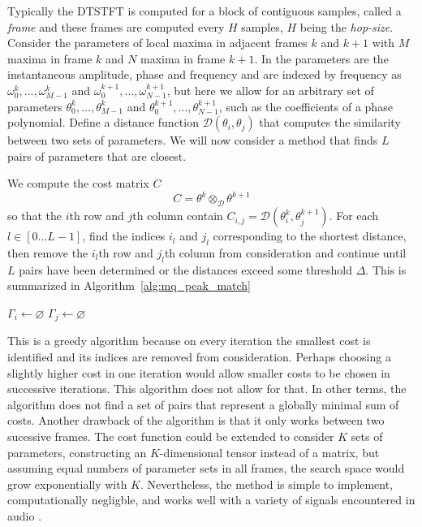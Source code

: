\documentclass[letterpaper,12pt]{report}
\DeclareMathOperator{\argmin}{argmin}
\begin{document}
Typically the DTSTFT is computed for a block of contiguous samples, called a
\textit{frame} and these frames are computed every $H$ samples, $H$ being the
\textit{hop-size}. Consider the parameters of local maxima in adjacent frames
$k$ and $k+1$ with $M$ maxima in frame $k$ and $N$ maxima in frame $k+1$. In
\cite{mcaulay1986speech}  the parameters are the instantaneous amplitude, phase
and frequency and are indexed by frequency as $\omega_0^{k}, \dotsc,
\omega_{M-1}^{k}$ and $\omega_0^{k+1}, \dotsc, \omega_{N-1}^{k+1}$, but here we
allow for an arbitrary set of parameters $\theta_0^{k}, \dotsc,
\theta_{M-1}^{k}$ and $\theta_0^{k+1}, \dotsc,
\theta_{N-1}^{k+1}$, such as the coefficients of a phase polynomial. Define a
distance function $\mathcal{D} \left( \theta_{i},\theta_{j} \right)$ that computes the
similarity between two sets of parameters. We will now consider a method that
finds $L$ pairs of parameters that are closest.

We compute the cost matrix $C$
\[
    C = \theta^{k} \otimes_{\mathcal{D}} \theta^{k+1}
\]
so that the $i$th row and $j$th column contain $C_{i,j} = \mathcal{D} \left(
\theta_{i}^{k},\theta_{j}^{k+1} \right)$.  For each $l \in \left[0 \dotsc L-1
\right]$, find the indices $i_{l}$ and $j_{l}$ corresponding to the shortest
distance, then remove the $i_{l}$th row and $j_{l}$th column from consideration
and continue until $L$ pairs have been determined or the distances exceed some
threshold $\Delta$. This is summarized in Algorithm~\ref{alg:mq_peak_match}

\begin{algorithm}[H]
    \caption{\label{alg:mq_peak_match}}
    $\Gamma_{i} \leftarrow \varnothing$\;
    $\Gamma_{j} \leftarrow \varnothing$\;
    \For{$l \leftarrow 0$ to $L-1$}{
        $i_{l},j_{l}=\argmin_{i \in \left[ 0,\dotsc,M-1 \right] \setminus
        \Gamma_{i}, j \in \left[ 0,\dotsc,M-1 \right] \setminus \Gamma_{j}}
        C_{i,j}$\;
        \If{$ C_{i_{l},j_{l}} > \Delta$}{
            \KwRet{$\Gamma_{i},\Gamma_{j}$}
        }
        $\Gamma_{i} \leftarrow \Gamma{i} \cup i_{l}$\;
        $\Gamma_{j} \leftarrow \Gamma{i} \cup j_{l}$\;
    }
\end{algorithm}

This is a greedy algorithm because on every iteration the smallest cost is
identified and its indices are removed from consideration. Perhaps choosing a
slightly higher cost in one iteration would allow smaller costs to be chosen in
successive iterations. This algorithm does not allow for that. In other terms,
the algorithm does not find a set of pairs that represent a globally minimal sum of
costs.
Another drawback of the algorithm is that it only works between two sucessive
frames. The cost function could be extended to consider $K$ sets of parameters,
constructing an $K$-dimensional tensor instead of a matrix, but assuming equal
numbers of parameter sets in all frames, the search space would grow exponentially
with $K$. Nevertheless, the method is simple to implement, computationally
negligble, and works well with a variety of signals encountered in audio
\cite{mcaulay1986speech} \cite{smith1987parshl}.
\end{document}
